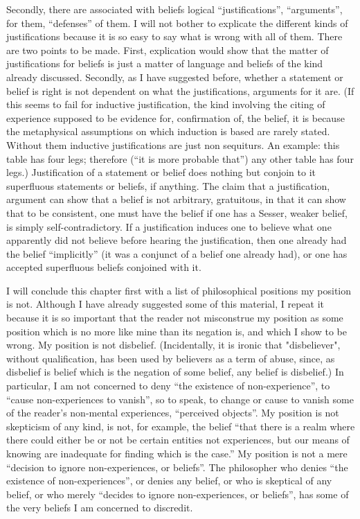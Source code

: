 Secondly, there are associated with beliefs logical \enquote{justifications}, 
\enquote{arguments}, for them, \enquote{defenses} of them. I will not bother to explicate 
the different kinds of justifications because it is so easy to say what is wrong 
with all of them. There are two points to be made. First, explication would 
show that the matter of justifications for beliefs is just a matter of language 
and beliefs of the kind already discussed. Secondly, as I have suggested 
before, whether a statement or belief is right is not dependent on what the 
justifications, arguments for it are. (If this seems to fail for inductive 
justification, the kind involving the citing of experience supposed to be 
evidence for, confirmation of, the belief, it is because the metaphysical 
assumptions on which induction is based are rarely stated. Without them 
inductive justifications are just non sequiturs. An example: this table has 
four legs; therefore (\enquote{it is more probable that}) any other table has four 
legs.) Justification of a statement or belief does nothing but conjoin to it 
superfluous statements or beliefs, if anything. The claim that a justification, 
argument can show that a belief is not arbitrary, gratuitous, in that it can 
show that to be consistent, one must have the belief if one has a Sesser, 
weaker belief, is simply self-contradictory. If a justification induces one to 
believe what one apparently did not believe before hearing the justification, 
then one already had the belief \enquote{implicitly} (it was a conjunct of a belief 
one already had), or one has accepted superfluous beliefs conjoined with it. 

I will conclude this chapter first with a list of philosophical positions 
my position is not. Although I have already suggested some of this material, 
I repeat it because it is so important that the reader not misconstrue my 
position as some position which is no more like mine than its negation is, 
and which I show to be wrong. My position is not disbelief. (Incidentally, it 
is ironic that "disbeliever", without qualification, has been used by believers 
as a term of abuse, since, as disbelief is belief which is the negation of some 
belief, any belief is disbelief.) In particular, I am not concerned to deny \enquote{the 
existence of non-experience}, to \enquote{cause non-experiences to vanish}, so to 
speak, to change or cause to vanish some of the reader's non-mental 
experiences, \enquote{perceived objects}. My position is not skepticism of any kind, 
is not, for example, the belief \enquote{that there is a realm where there could either 
be or not be certain entities not experiences, but our means of knowing are 
inadequate for finding which is the case.} My position is not a mere 
\enquote{decision to ignore non-experiences, or beliefs}. The philosopher who denies 
\enquote{the existence of non-experiences}, or denies any belief, or who is skeptical 
of any belief, or who merely \enquote{decides to ignore non-experiences, or beliefs}, 
has some of the very beliefs I am concerned to discredit. 

